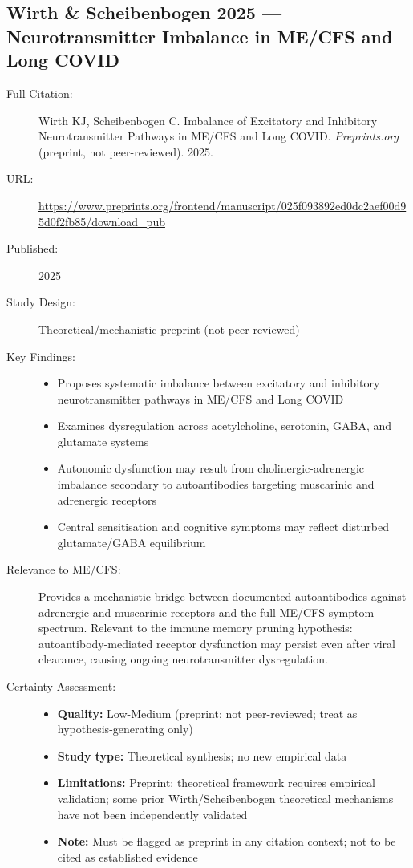 \subsection{Wirth \& Scheibenbogen 2025 --- Neurotransmitter Imbalance in ME/CFS and Long COVID}

\begin{description}
    \item[Full Citation:] Wirth KJ, Scheibenbogen C. Imbalance of Excitatory and Inhibitory Neurotransmitter Pathways in ME/CFS and Long COVID. \textit{Preprints.org} (preprint, not peer-reviewed). 2025.
    \item[URL:] \url{https://www.preprints.org/frontend/manuscript/025f093892ed0dc2aef00d95d0f2fb85/download_pub}
    \item[Published:] 2025
    \item[Study Design:] Theoretical/mechanistic preprint (not peer-reviewed)
    \item[Key Findings:]
    \begin{itemize}
        \item Proposes systematic imbalance between excitatory and inhibitory neurotransmitter pathways in ME/CFS and Long COVID
        \item Examines dysregulation across acetylcholine, serotonin, GABA, and glutamate systems
        \item Autonomic dysfunction may result from cholinergic-adrenergic imbalance secondary to autoantibodies targeting muscarinic and adrenergic receptors
        \item Central sensitisation and cognitive symptoms may reflect disturbed glutamate/GABA equilibrium
    \end{itemize}
    \item[Relevance to ME/CFS:] Provides a mechanistic bridge between documented autoantibodies against adrenergic and muscarinic receptors and the full ME/CFS symptom spectrum. Relevant to the immune memory pruning hypothesis: autoantibody-mediated receptor dysfunction may persist even after viral clearance, causing ongoing neurotransmitter dysregulation.
    \item[Certainty Assessment:]
    \begin{itemize}
        \item \textbf{Quality:} Low-Medium (preprint; not peer-reviewed; treat as hypothesis-generating only)
        \item \textbf{Study type:} Theoretical synthesis; no new empirical data
        \item \textbf{Limitations:} Preprint; theoretical framework requires empirical validation; some prior Wirth/Scheibenbogen theoretical mechanisms have not been independently validated
        \item \textbf{Note:} Must be flagged as preprint in any citation context; not to be cited as established evidence
    \end{itemize}
\end{description}

